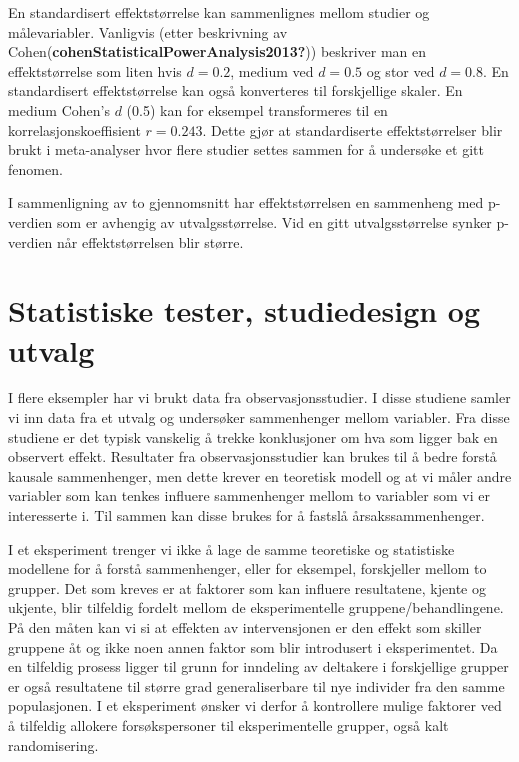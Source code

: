 \documentclass[
  letterpaper,
  DIV=11,
  numbers=noendperiod,
  oneside]{scrreprt}
\begin{document}
En standardisert effektstørrelse kan sammenlignes mellom studier og
målevariabler. Vanligvis (etter beskrivning av
Cohen(\textbf{cohenStatisticalPowerAnalysis2013?}))
beskriver man en effektstørrelse som liten hvis \(d = 0.2\), medium ved
\(d=0.5\) og stor ved \(d=0.8\). En standardisert effektstørrelse kan
også konverteres til forskjellige skaler. En medium Cohen's \(d\) (0.5)
kan for eksempel transformeres til en korrelasjonskoeffisient
\(r= 0.243\). Dette gjør at standardiserte effektstørrelser blir brukt i
meta-analyser hvor flere studier settes sammen for å undersøke et gitt
fenomen.

I sammenligning av to gjennomsnitt har effektstørrelsen en sammenheng
med p-verdien som er avhengig av utvalgsstørrelse. Vid en gitt
utvalgsstørrelse synker p-verdien når effektstørrelsen blir større.

\hypertarget{statistiske-tester-studiedesign-og-utvalg}{%
\section{Statistiske tester, studiedesign og
utvalg}\label{statistiske-tester-studiedesign-og-utvalg}}

I flere eksempler har vi brukt data fra observasjonsstudier. I disse
studiene samler vi inn data fra et utvalg og undersøker sammenhenger
mellom variabler. Fra disse studiene er det typisk vanskelig å trekke
konklusjoner om hva som ligger bak en observert effekt. Resultater fra
observasjonsstudier kan brukes til å bedre forstå kausale sammenhenger,
men dette krever en teoretisk modell og at vi måler andre variabler som
kan tenkes influere sammenhenger mellom to variabler som vi er
interesserte i. Til sammen kan disse brukes for å fastslå
årsakssammenhenger.

I et eksperiment trenger vi ikke å lage de samme teoretiske og
statistiske modellene for å forstå sammenhenger, eller for eksempel,
forskjeller mellom to grupper. Det som kreves er at faktorer som kan
influere resultatene, kjente og ukjente, blir tilfeldig fordelt mellom
de eksperimentelle gruppene/behandlingene. På den måten kan vi si at
effekten av intervensjonen er den effekt som skiller gruppene åt og ikke
noen annen faktor som blir introdusert i eksperimentet. Da en tilfeldig
prosess ligger til grunn for inndeling av deltakere i forskjellige
grupper er også resultatene til større grad generaliserbare til nye
individer fra den samme populasjonen. I et eksperiment ønsker vi derfor
å kontrollere mulige faktorer ved å tilfeldig allokere forsøkspersoner
til eksperimentelle grupper, også kalt randomisering.
\end{document}
